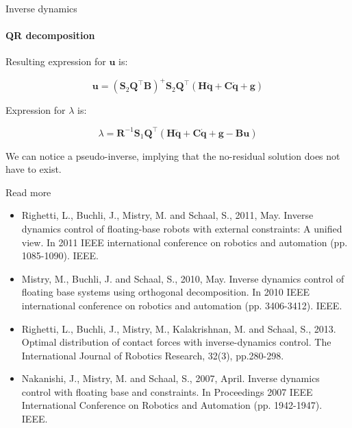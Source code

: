 \documentclass{beamer}
\begin{document}
\begin{frame}{Inverse dynamics}
	\framesubtitle{QR decomposition}
	\begin{flushleft}
		
		Resulting expression for $\mathbf{u}$ is:
		
		\begin{equation}
			\mathbf{u} = 
			(\mathbf{S}_2\mathbf{Q}^\top\mathbf{B})^+ \mathbf{S}_2 \mathbf{Q}^\top (\mathbf{H}\ddot{\mathbf{q}} + \mathbf{C}\dot{\mathbf{q}} + \mathbf{g})
		\end{equation}
		
		Expression for $\lambda$ is:
		
		\begin{equation}
			\lambda = \mathbf{R}^{-1} \mathbf{S}_1 \mathbf{Q}^\top (\mathbf{H}\ddot{\mathbf{q}} + \mathbf{C}\dot{\mathbf{q}} + \mathbf{g} - \mathbf{B}\mathbf{u})
		\end{equation}
		
		We can notice a pseudo-inverse, implying that the no-residual solution does not have to exist.
		
	\end{flushleft}
\end{frame}





\begin{frame}{Read more}
	\begin{flushleft}
		
		
		\begin{itemize}
			\item Righetti, L., Buchli, J., Mistry, M. and Schaal, S., 2011, May. Inverse dynamics control of floating-base robots with external constraints: A unified view. In 2011 IEEE international conference on robotics and automation (pp. 1085-1090). IEEE.
			
			\item Mistry, M., Buchli, J. and Schaal, S., 2010, May. Inverse dynamics control of floating base systems using orthogonal decomposition. In 2010 IEEE international conference on robotics and automation (pp. 3406-3412). IEEE.
			
			\item Righetti, L., Buchli, J., Mistry, M., Kalakrishnan, M. and Schaal, S., 2013. Optimal distribution of contact forces with inverse-dynamics control. The International Journal of Robotics Research, 32(3), pp.280-298.
			
			\item Nakanishi, J., Mistry, M. and Schaal, S., 2007, April. Inverse dynamics control with floating base and constraints. In Proceedings 2007 IEEE International Conference on Robotics and Automation (pp. 1942-1947). IEEE.
		\end{itemize}
		
		
	\end{flushleft}
\end{frame}
\end{document}

